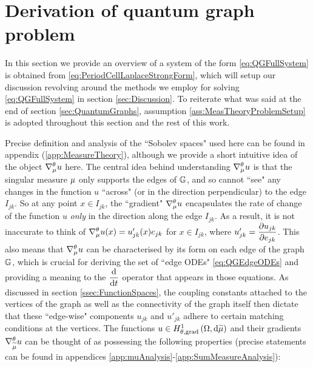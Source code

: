 \section{Derivation of quantum graph problem} \label{sec:SystemDerivation}
In this section we provide an overview of a system of the form \eqref{eq:QGFullSystem} is obtained from \eqref{eq:PeriodCellLaplaceStrongForm}, which will setup our discussion revolving around the methods we employ for solving \eqref{eq:QGFullSystem} in section \ref{sec:Discussion}.
To reiterate what was said at the end of section \ref{sec:QuantumGraphs}, assumption \ref{ass:MeasTheoryProblemSetup} is adopted throughout this section and the rest of this work. 

Precise definition and analysis of the ``Sobolev spaces" used here can be found in appendix (\ref{app:MeasureTheory}), although we provide a short intuitive idea of the object $\nabla^{\theta}_{\mu}u$ here.
The central idea behind understanding $\nabla^{\theta}_{\mu}u$ is that the singular measure $\mu$ only supports the edges of $\mathbb{G}$, and so cannot ``see" any changes in the function $u$ ``across" (or in the direction perpendicular) to the edge $I_{jk}$.
So at any point $x\in I_{jk}$, the ``gradient" $\nabla^{\theta}_{\mu}u$ encapsulates the rate of change of the function $u$ \emph{only} in the direction along the edge $I_{jk}$.
As a result, it is not inaccurate to think of $\nabla^{\theta}_{\mu}u(x) = u_{jk}'(x)e_{jk}$ for $x\in I_{jk}$, where $u_{jk}' = \dfrac{\partial u_{jk}}{\partial e_{jk}}$.
This also means that $\nabla^{\theta}_{\mu}u$ can be characterised by its form on each edge of the graph $\mathbb{G}$, which is crucial for deriving the set of ``edge ODEs" \eqref{eq:QGEdgeODEs} and providing a meaning to the $\dfrac{\mathrm{d}}{\mathrm{d}t}$ operator that appears in those equations.
As discussed in section \ref{ssec:FunctionSpaces}, the coupling constants attached to the vertices of the graph as well as the connectivity of the graph itself then dictate that these ``edge-wise" components $u_{jk}$ and $u'_{jk}$ adhere to certain matching conditions at the vertices.
The functions $u\in H^1_{\theta, \mathrm{grad}}\left( \Omega, \mathrm{d}\widetilde{\mu} \right)$ and their gradients $\nabla^{\theta}_{\widetilde{\mu}}u$ can be thought of as possessing the following properties (precise statements can be found in appendices \ref{app:muAnalysis}-\ref{app:SumMeasureAnalysis}):
